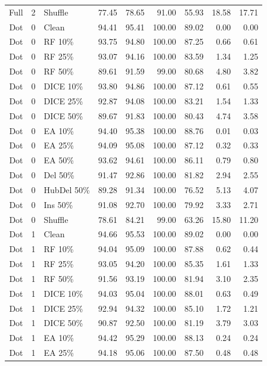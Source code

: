 {\begin{longtable}{rllrrrrrr}
Full & 2 & Shuffle & 77.45 & 78.65 & 91.00 & 55.93 & 18.58 & 17.71 \\
Dot & 0 & Clean & 94.41 & 95.41 & 100.00 & 89.02 & 0.00 & 0.00 \\
Dot & 0 & RF 10\% & 93.75 & 94.80 & 100.00 & 87.25 & 0.66 & 0.61 \\
Dot & 0 & RF 25\% & 93.07 & 94.16 & 100.00 & 83.59 & 1.34 & 1.25 \\
Dot & 0 & RF 50\% & 89.61 & 91.59 & 99.00 & 80.68 & 4.80 & 3.82 \\
Dot & 0 & DICE 10\% & 93.80 & 94.86 & 100.00 & 87.12 & 0.61 & 0.55 \\
Dot & 0 & DICE 25\% & 92.87 & 94.08 & 100.00 & 83.21 & 1.54 & 1.33 \\
Dot & 0 & DICE 50\% & 89.67 & 91.83 & 100.00 & 80.43 & 4.74 & 3.58 \\
Dot & 0 & EA 10\% & 94.40 & 95.38 & 100.00 & 88.76 & 0.01 & 0.03 \\
Dot & 0 & EA 25\% & 94.09 & 95.08 & 100.00 & 87.12 & 0.32 & 0.33 \\
Dot & 0 & EA 50\% & 93.62 & 94.61 & 100.00 & 86.11 & 0.79 & 0.80 \\
Dot & 0 & Del 50\% & 91.47 & 92.86 & 100.00 & 81.82 & 2.94 & 2.55 \\
Dot & 0 & HubDel 50\% & 89.28 & 91.34 & 100.00 & 76.52 & 5.13 & 4.07 \\
Dot & 0 & Ins 50\% & 91.08 & 92.70 & 100.00 & 79.92 & 3.33 & 2.71 \\
Dot & 0 & Shuffle & 78.61 & 84.21 & 99.00 & 63.26 & 15.80 & 11.20 \\
Dot & 1 & Clean & 94.66 & 95.53 & 100.00 & 89.02 & 0.00 & 0.00 \\
Dot & 1 & RF 10\% & 94.04 & 95.09 & 100.00 & 87.88 & 0.62 & 0.44 \\
Dot & 1 & RF 25\% & 93.05 & 94.20 & 100.00 & 85.35 & 1.61 & 1.33 \\
Dot & 1 & RF 50\% & 91.56 & 93.19 & 100.00 & 81.94 & 3.10 & 2.35 \\
Dot & 1 & DICE 10\% & 94.03 & 95.04 & 100.00 & 88.01 & 0.63 & 0.49 \\
Dot & 1 & DICE 25\% & 92.94 & 94.32 & 100.00 & 85.10 & 1.72 & 1.21 \\
Dot & 1 & DICE 50\% & 90.87 & 92.50 & 100.00 & 81.19 & 3.79 & 3.03 \\
Dot & 1 & EA 10\% & 94.42 & 95.29 & 100.00 & 88.13 & 0.24 & 0.24 \\
Dot & 1 & EA 25\% & 94.18 & 95.06 & 100.00 & 87.50 & 0.48 & 0.48 \\

\end{longtable}}
